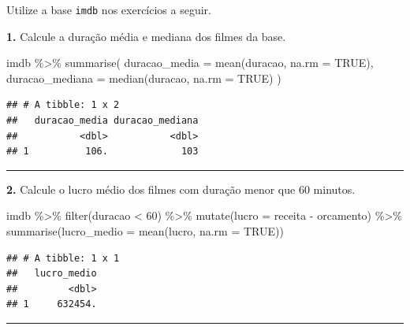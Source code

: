 \documentclass[
]{book}
\newenvironment{Shaded}{\begin{snugshade}}{\end{snugshade}}
\newcommand{\AttributeTok}[1]{\textcolor[rgb]{0.77,0.63,0.00}{#1}}
\newcommand{\ConstantTok}[1]{\textcolor[rgb]{0.00,0.00,0.00}{#1}}
\newcommand{\DecValTok}[1]{\textcolor[rgb]{0.00,0.00,0.81}{#1}}
\newcommand{\FunctionTok}[1]{\textcolor[rgb]{0.00,0.00,0.00}{#1}}
\newcommand{\NormalTok}[1]{#1}
\newcommand{\SpecialCharTok}[1]{\textcolor[rgb]{0.00,0.00,0.00}{#1}}
\begin{document}
Utilize a base \texttt{imdb} nos exercícios a seguir.

\textbf{1.} Calcule a duração média e mediana dos filmes
da base.

\begin{Shaded}
\begin{Highlighting}[]
\NormalTok{imdb }\SpecialCharTok{\%\textgreater{}\%} 
  \FunctionTok{summarise}\NormalTok{(}
    \AttributeTok{duracao\_media =} \FunctionTok{mean}\NormalTok{(duracao, }\AttributeTok{na.rm =} \ConstantTok{TRUE}\NormalTok{),}
    \AttributeTok{duracao\_mediana =} \FunctionTok{median}\NormalTok{(duracao, }\AttributeTok{na.rm =} \ConstantTok{TRUE}\NormalTok{)}
\NormalTok{  )}
\end{Highlighting}
\end{Shaded}

\begin{verbatim}
## # A tibble: 1 x 2
##   duracao_media duracao_mediana
##           <dbl>           <dbl>
## 1          106.             103
\end{verbatim}

\begin{center}\rule{0.5\linewidth}{0.5pt}\end{center}

\textbf{2.} Calcule o lucro médio dos filmes com duração
menor que 60 minutos.

\begin{Shaded}
\begin{Highlighting}[]
\NormalTok{imdb }\SpecialCharTok{\%\textgreater{}\%} 
  \FunctionTok{filter}\NormalTok{(duracao }\SpecialCharTok{\textless{}} \DecValTok{60}\NormalTok{) }\SpecialCharTok{\%\textgreater{}\%} 
  \FunctionTok{mutate}\NormalTok{(}\AttributeTok{lucro =}\NormalTok{ receita }\SpecialCharTok{{-}}\NormalTok{ orcamento) }\SpecialCharTok{\%\textgreater{}\%} 
  \FunctionTok{summarise}\NormalTok{(}\AttributeTok{lucro\_medio =} \FunctionTok{mean}\NormalTok{(lucro, }\AttributeTok{na.rm =} \ConstantTok{TRUE}\NormalTok{))}
\end{Highlighting}
\end{Shaded}

\begin{verbatim}
## # A tibble: 1 x 1
##   lucro_medio
##         <dbl>
## 1     632454.
\end{verbatim}

\begin{center}\rule{0.5\linewidth}{0.5pt}\end{center}
\end{document}

